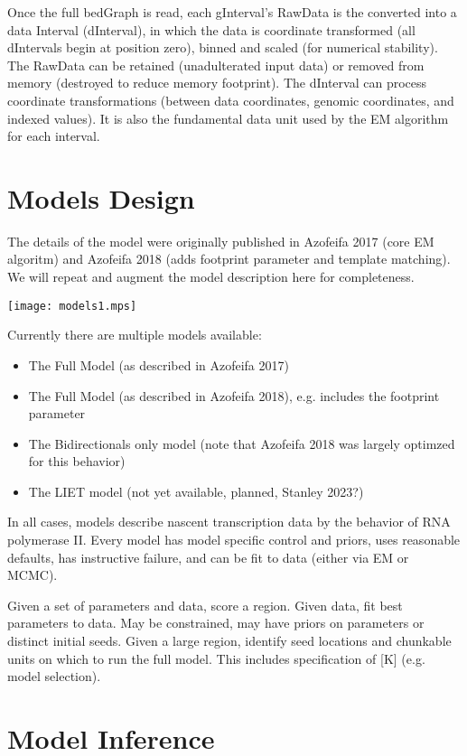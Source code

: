 \documentclass[11pt]{article}
\begin{document}
Once the full bedGraph is read, each gInterval's RawData is the converted into
a data Interval (dInterval), in which the data is coordinate transformed (all
dIntervals begin at position zero), binned and scaled (for numerical
stability).  The RawData can be retained (unadulterated input data) or removed 
from memory (destroyed to reduce memory footprint).  The dInterval can 
process coordinate transformations (between data coordinates, genomic 
coordinates, and indexed values).  It is also the fundamental data unit 
used by the EM algorithm for each interval.

\clearpage
\section{Models Design}
The details of the model were originally published in Azofeifa 2017 (core EM
    algoritm) and Azofeifa 2018 (adds footprint parameter and template matching).  
We will repeat and augment the model description here for
completeness. 

\texttt{[image: models1.mps]}

Currently there are multiple models available:

\begin{itemize}
\item The Full Model (as described in Azofeifa 2017)
\item The Full Model (as described in Azofeifa 2018), e.g. includes
the footprint parameter
\item The Bidirectionals only model (note that Azofeifa 2018 was largely
    optimzed for this behavior)
\item The LIET model (not yet available, planned, Stanley 2023?)
\end{itemize}

In all cases, models describe nascent transcription data by 
the behavior of RNA polymerase II.   Every model has model specific control
and priors, uses reasonable defaults, has instructive failure, and can 
be fit to data (either via EM or MCMC).

Given a set of parameters and data, score a region.
Given data, fit best parameters to data.  May be constrained, may have 
priors on parameters or distinct initial seeds.
Given a large region, identify seed locations and chunkable units on which to
run the full model.   This includes specification of [K] (e.g. model selection).

\section{Model Inference}
\end{document}
